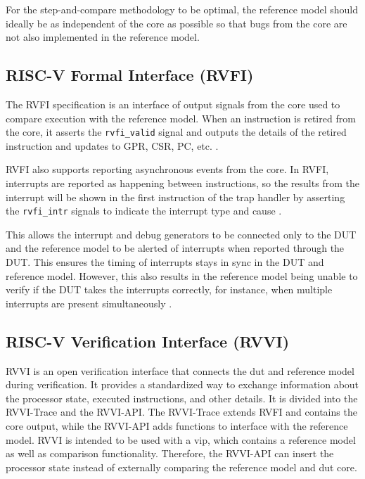 For the step-and-compare methodology to be optimal, the reference model should ideally be as independent of the core as possible so that bugs from the core are not also implemented in the reference model.

\subsection{RISC-V Formal Interface (RVFI)}
\label{sec:rvfi}

The RVFI specification is an interface of output signals from the core used to compare execution with the reference model. 
When an instruction is retired from the core, it asserts the \lstinline{rvfi_valid} signal and outputs the details of the retired instruction and updates to GPR, CSR, PC, etc. \cite{symbioticedaRiscvformalDocsRvfi2020}.

RVFI also supports reporting asynchronous events from the core. In RVFI, interrupts are reported as happening between instructions, so the results from the interrupt will be shown in the first instruction of the trap handler by asserting the \lstinline{rvfi_intr} signals to indicate the interrupt type and cause \cite{openhwgroupRISCVFormalInterface2023}.

This allows the interrupt and debug generators to be connected only to the DUT and the reference model to be alerted of interrupts when reported through the DUT.
This ensures the timing of interrupts stays in sync in the DUT and reference model. However, this also results in the reference model being unable to verify if the DUT takes the interrupts correctly, for instance, when multiple interrupts are present simultaneously \cite{taylorAdvancedRISCVVerification2023}.




\subsection{RISC-V Verification Interface (RVVI)}
\label{sec:rvvi}

RVVI \cite{riscv-verificationRISCVVerificationInterface2023} is an open verification interface that connects the \acrfull{dut} and reference model during verification. It provides a standardized way to exchange information about the processor state, executed instructions, and other details. It is divided into the RVVI-Trace and the RVVI-API. The RVVI-Trace extends RVFI and contains the core output, while the RVVI-API adds functions to interface with the reference model. RVVI is intended to be used with a \acrshort{vip}, which contains a reference model as well as comparison functionality. Therefore, the RVVI-API can insert the processor state instead of externally comparing the reference model and \acrshort{dut} core.

